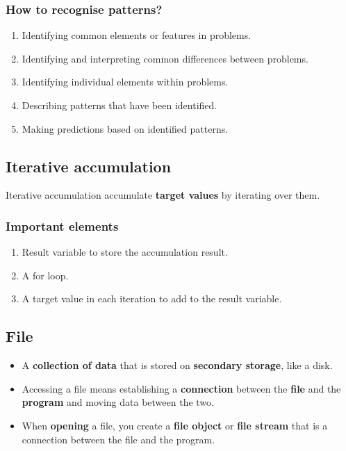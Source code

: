 \documentclass[11pt]{article}
\begin{document}
\subsubsection{How to recognise patterns?}
\label{sec:org781b9f3}
\begin{enumerate}
\item Identifying common elements or features in problems.
\item Identifying and interpreting common differences between problems.
\item Identifying individual elements within problems.
\item Describing patterns that have been identified.
\item Making predictions based on identified patterns.
\end{enumerate}

 \newpage

\subsection{Iterative accumulation}
\label{sec:orgc7f0290}
Iterative accumulation accumulate \textbf{target values} by iterating over them.

\subsubsection{Important elements}
\label{sec:org13c9a32}
\begin{enumerate}
\item Result variable to store the accumulation result.
\item A for loop.
\item A target value in each iteration to add to the result variable.
\end{enumerate}

\subsection{File}
\label{sec:orgaea2328}
\begin{itemize}
\item A \textbf{collection of data} that is stored on \textbf{secondary storage}, like a disk.
\item Accessing a file means establishing a \textbf{connection} between the \textbf{file} and the \textbf{program} and moving data between the two.
\item When \textbf{opening} a file, you create a \textbf{file object} or \textbf{file stream} that is a connection between the file and the program.
\end{itemize}
\end{document}
